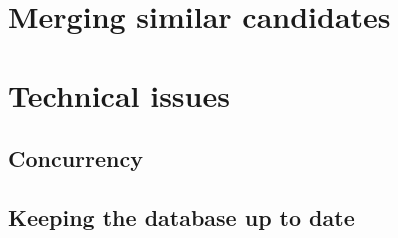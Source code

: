 \section{Merging similar candidates}




\section{Technical issues}

\subsection{Concurrency}





\subsection{Keeping the database up to date}





